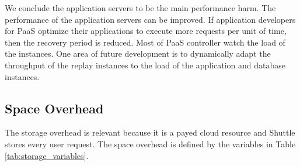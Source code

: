 
We conclude the application servers to be the main performance harm. The performance of the application servers can be improved. If application developers for \ac{PaaS} optimize their applications to execute more requests per unit of time, then the recovery period is reduced. %
Most of \ac{PaaS} controller watch the load of the instances. One area of future development is to dynamically adapt the throughput of the replay instances to the load of the application and database instances.





\subsection{Space Overhead}\label{sec:eval:storage}
The storage overhead is relevant because it is a payed cloud resource and Shuttle stores every user request. The space overhead is defined by the variables in Table \ref{tab:storage_variables}.

